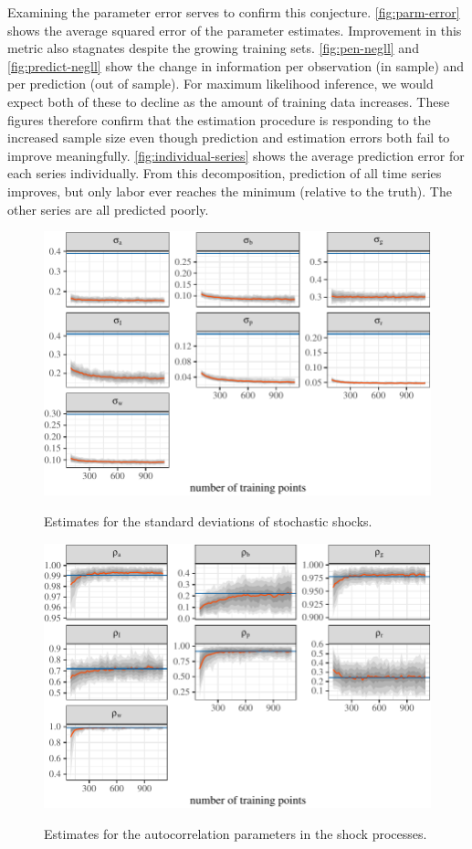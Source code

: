\documentclass[11pt]{article}
\begin{document}
Examining the parameter error serves to confirm this conjecture.
\autoref{fig:parm-error} shows the average squared error of the
parameter estimates. Improvement in this metric also stagnates despite
the growing training sets. \autoref{fig:pen-negll} and
\autoref{fig:predict-negll} show the change in information per
observation (in sample) and per prediction (out of sample). For maximum
likelihood inference, we would expect both of these to decline as the
amount of training data increases. These figures therefore confirm that
the estimation procedure is responding to the increased sample size even
though prediction and estimation errors both fail to improve
meaningfully. \autoref{fig:individual-series} shows the average
prediction error for each series individually. From this decomposition,
prediction of all time series improves, but only labor ever reaches the
minimum (relative to the truth). The other series are all predicted
poorly.

\begin{figure}[t]

{\centering \includegraphics{gfx/shock-sds-1} }
\caption{Estimates for the standard deviations of stochastic shocks.}\label{fig:shock-sds}
\end{figure}

\begin{figure}[t]
{\centering \includegraphics{gfx/autocorrelations-shocks-1} }

\caption{Estimates for the autocorrelation parameters in the shock processes.}\label{fig:autocorrelations-shocks}
\end{figure}
\end{document}
